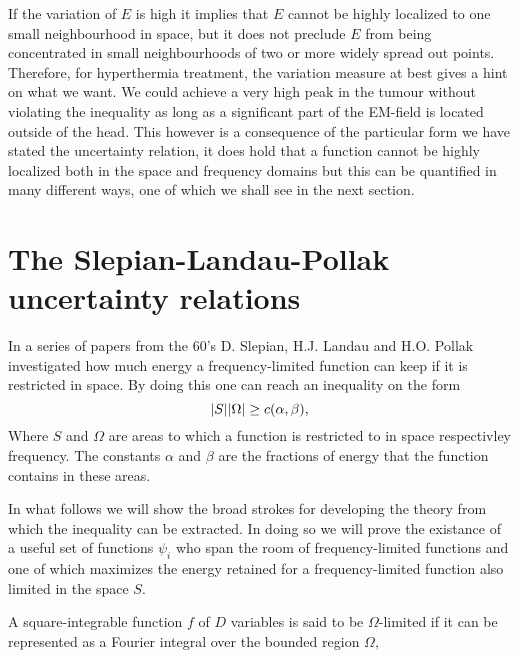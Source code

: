 \documentclass[11pt,a4paper, 
english, swedish %
]{article}
\begin{document}
If the variation of $E$ is high it implies that $E$ cannot be highly localized to one small neighbourhood in space, but it does not preclude $E$ from being concentrated in small neighbourhoods of two or more widely spread out points. Therefore, for hyperthermia treatment, the variation measure at best gives a hint on what we want. We could achieve a very high peak in the tumour without violating the inequality as long as a significant part of the EM-field is located outside of the head.
This however is a consequence of the particular form we have stated the uncertainty relation, it does hold that a function cannot be highly localized both in the space and frequency domains but this can be quantified in many different ways, one of which we shall see in the next section.


\section{The Slepian-Landau-Pollak uncertainty relations}
In a series of papers from the 60's D. Slepian, H.J. Landau and H.O. Pollak investigated how much energy a frequency-limited function can keep if it is restricted in space. By doing this one can reach an inequality on the form
\begin{equation}
\abs{S}\abs{\Omega} \geq c(\alpha,\beta),
\end{equation}
Where $S$ and $\Omega$ are areas to which a function is restricted to in space respectivley frequency. The constants $\alpha$ and $\beta$ are the fractions of energy that the function contains in these areas. 

In what follows we will show the broad strokes for developing the theory from which the inequality can be extracted. In doing so we will prove the existance of a useful set of functions ${\psi_i}$ who span the room of frequency-limited functions and one of which maximizes the energy retained for a frequency-limited function also limited in the space $S$.

A square-integrable function $f$ of $D$ variables is said to be $\Omega$-limited if it can be represented as a Fourier integral over the bounded region $\Omega$,
\end{document}
